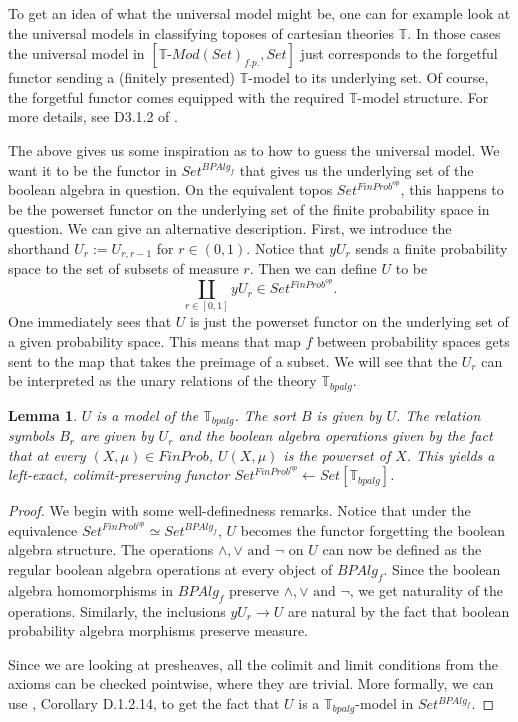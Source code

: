 \documentclass[a4paper]{amsproc}
\theoremstyle{plain}
\newtheorem{lemma}[theorem]{Lemma}
\theoremstyle{definition}
\theoremstyle{remark}
\numberwithin{equation}{section}
\begin{document}
To get an idea of what the universal model might be, one can for example look at the universal models in classifying toposes of cartesian theories $\mathbb{T}$. In those cases the universal model in $[\mathbb{T} \text{-} Mod(Set)_{f.p.}, Set]$ just corresponds to the forgetful functor sending a (finitely presented) $\mathbb{T}$-model to its underlying set. Of course, the forgetful functor comes equipped with the required $\mathbb{T}$-model structure. For more details, see D3.1.2 of \cite{elephant}.

The above gives us some inspiration as to how to guess the universal model. We want it to be the functor in $Set^{BPAlg_f}$ that gives us the underlying set of the boolean algebra in question. On the equivalent topos $Set^{FinProb^{op}}$, this happens to be the powerset functor on the underlying set of the finite probability space in question. We can give an alternative description. First, we introduce the shorthand $U_r := U_{r,r-1}$ for $r \in (0,1)$. Notice that $y U_r$ sends a finite probability space to the set of subsets of measure $r$. Then we can define $U$ to be
\[
\coprod_{r \in [0,1]} y U_r \in Set^{FinProb^{op}} .
\]
One immediately sees that $U$ is just the powerset functor on the underlying set of a given probability space. This means that map $f$ between probability spaces gets sent to the map that takes the preimage of a subset. We will see that the $U_r$ can be interpreted as the unary relations of the theory $\mathbb{T}_{bpalg}$.

\begin{lemma} \label{universal model}
$U$ is a model of the $\mathbb{T}_{bpalg}$. The sort $B$ is given by $U$. The relation symbols $B_r$ are given by $U_r$ and the boolean algebra operations given by the fact that at every $(X,\mu) \in FinProb$, $U(X, \mu)$ is the powerset of $X$. This yields a left-exact, colimit-preserving functor $Set^{FinProb^{op}} \leftarrow Set[\mathbb{T}_{bpalg}]$.
\end{lemma}
\begin{proof}
We begin with some well-definedness remarks. Notice that under the equivalence $Set^{FinProb^{op}} \simeq Set^{BPAlg_f}$, $U$ becomes the functor forgetting the boolean algebra structure. The operations $\wedge, \vee \text{ and } \neg$ on $U$ can now be defined as the regular boolean algebra operations at every object of $BPAlg_f$. Since the boolean algebra homomorphisms in $BPAlg_f$ preserve $\wedge, \vee \text{ and } \neg$, we get naturality of the operations. Similarly, the inclusions $y U_r \to U$ are natural by the fact that boolean probability algebra morphisms preserve measure.

Since we are looking at presheaves, all the colimit and limit conditions from the axioms can be checked pointwise, where they are trivial. More formally, we can use \cite{elephant}, Corollary D.1.2.14, to get the fact that $U$ is a $\mathbb{T}_{bpalg}$-model in $Set^{BPAlg_f}$.
\end{proof}
\end{document}
